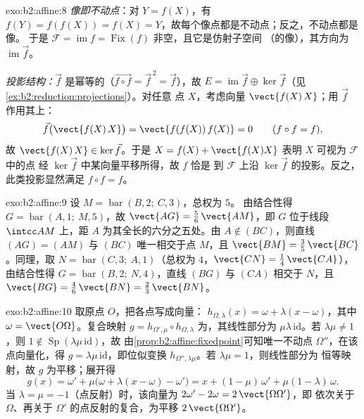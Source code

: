 \begin{solution}{exo:b2:affine:8}
\emph{像即不动点}：对 $Y = f(X)$，有 $f(Y) = f(f(X)) =
f(X) = Y$，故每个像点都是不动点；反之，不动点都是像。
于是 $\mathcal{F} = \operatorname{im} f =
\operatorname{Fix}(f)$ 非空，且它是仿射子空间
（的像），其方向为 $\operatorname{im}\vec f$。

\emph{投影结构：}$\vec f$ 是幂等的（$\vec{f\circ
f} = \vec f^{\,2} = \vec f$），故 $E = \operatorname{im}\vec f
\oplus \ker \vec f$（见\cref{ex:b2:reduction:projections}）。对任意
点 $X$，考虑向量 $\vect{f(X)\,X}$；用 $\vec f$ 作用其上：
\[
\vec f\bigl(\vect{f(X)\,X}\bigr) = \vect{f(f(X))\,f(X)} = 0
\qquad (f \circ f = f),
\]
故 $\vect{f(X)\,X} \in \ker\vec f$。于是 $X = f(X) +
\vect{f(X)X}$ 表明 $X$ 可视为 $\mathcal{F}$ 中的点
经 $\ker\vec f$ 中某向量平移所得，故 $f$ 恰是
到 $\mathcal{F}$ 上沿 $\ker\vec f$ 的投影。反之，
此类投影显然满足 $f \circ f = f$。
\end{solution}

\begin{solution}{exo:b2:affine:9}
设 $M = \operatorname{bar}(B, 2;\ C, 3)$，总权为 $5$。
由结合性得 $G = \operatorname{bar}(A, 1;\ M, 5)$，故
$\vect{AG} = \frac56\,\vect{AM}$，即 $G$ 位于线段
$\intcc AM$ 上，距 $A$ 为其全长的六分之五处。由 $A \notin
(BC)$，则直线 $(AG) = (AM)$ 与 $(BC)$ 唯一相交于点
$M$，且 $\vect{BM} = \frac35\,\vect{BC}$。同理，取 $N =
\operatorname{bar}(C, 3;\ A, 1)$（总权为 $4$，$\vect{CN}
= \frac14\,\vect{CA}$），由结合性得 $G =
\operatorname{bar}(B, 2;\ N, 4)$，直线 $(BG)$ 与 $(CA)$ 相交于
$N$，且 $\vect{BG} = \frac46\,\vect{BN} =
\frac23\,\vect{BN}$。
\end{solution}

\begin{solution}{exo:b2:affine:10}
取原点 $O$，把各点写成向量：
$h_{\Omega, \lambda}(x) = \omega + \lambda(x - \omega)$，其中
$\omega = \vect{O\Omega}$。复合映射 $g = h_{\Omega',
\mu} \circ h_{\Omega, \lambda}$ 为，其线性部分为
$\mu\lambda\,\mathrm{id}$。若 $\lambda\mu \neq 1$，则 $1 \notin
\operatorname{Sp}(\lambda\mu\,\mathrm{id})$，故
由\cref{prop:b2:affine:fixedpoint}可知唯一不动点
$\Omega''$，在该点向量化，得 $g =
\lambda\mu\,\mathrm{id}$，即位似变换 $h_{\Omega'',
\lambda\mu}$。若 $\lambda\mu = 1$，则线性部分为
恒等映射，故 $g$ 为平移；展开得
\[
g(x) = \omega' + \mu\bigl(\omega + \lambda(x - \omega) -
\omega'\bigr) = x + (1 - \mu)\,\omega' + \mu(1 -
\lambda)\,\omega .
\]
当 $\lambda = \mu = -1$（点反射）时，该向量为
$2\omega' - 2\omega = 2\,\vect{\Omega\Omega'}$，即
依次关于 $\Omega$、再关于
$\Omega'$ 的点反射的复合，为平移 $2\,\vect{\Omega\Omega'}$。
\end{solution}

